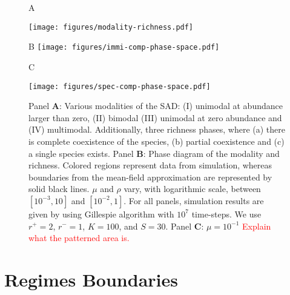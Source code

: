 \documentclass[%
 amsmath,amssymb,
reprint,%
linenumbers]{revtex4-2}
\begin{document}
\begin{figure*}[h!]
   \begin{flushleft}
        A
   \end{flushleft}
    \texttt{[image: figures/modality-richness.pdf]}
    \begin{minipage}{.45\linewidth}
    \begin{flushleft}
        B
    \texttt{[image: figures/immi-comp-phase-space.pdf]}
    \end{flushleft}
  \end{minipage}
  \hfill
  \begin{minipage}{.45\linewidth}
    \begin{flushright}
        \begin{flushleft}
            C
        \end{flushleft}
    \texttt{[image: figures/spec-comp-phase-space.pdf]}
    \end{flushright} 
  \end{minipage}
    \caption{Panel \textbf{A}: Various modalities of the SAD: (I) unimodal at abundance larger than zero, (II) bimodal (III) unimodal at zero abundance and (IV) multimodal. Additionally, three richness phases, where (a) there is complete coexistence of the species, (b) partial coexistence and (c) a single species exists. Panel \textbf{B}: Phase diagram of the modality and richness. Colored regions represent data from simulation, whereas boundaries from the mean-field approximation are represented by solid black lines. $\mu$ and $\rho$ vary, with logarithmic scale, between $[10^{-3}, 10]$ and $[10^{-2}, 1]$. For all panels, simulation results are given by using Gillespie algorithm with $10^7$ time-steps. We use $r^+=2$, $r^-=1$,  $K=100$,  and $S=30$. Panel \textbf{C}: $\mu=10^{-1}$ \textcolor{red}{Explain what the patterned area is.} }
    \label{fig:phases_sim}
\end{figure*}
    
\section{Regimes Boundaries}
\label{sec:Phase_transition}
\end{document}
